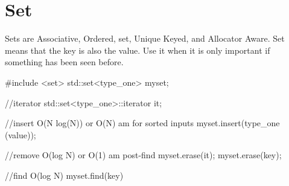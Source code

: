 \section{Set}
Sets are Associative, Ordered, set, Unique Keyed, and Allocator Aware\cite{cplusplus}.  Set means that the key is also the value. Use it when it is only important if something has been seen before.
\begin{code}
    #include <set>
    std::set<type_one> myset;

    //iterator
    std::set<type_one>::iterator it;

    //insert O(N log(N)) or O(N) am for sorted inputs
    myset.insert(type_one (value));

    //remove O(log N) or O(1) am post-find
    myset.erase(it);
    myset.erase(key);

    //find O(log N)
    myset.find(key)
\end{code}
